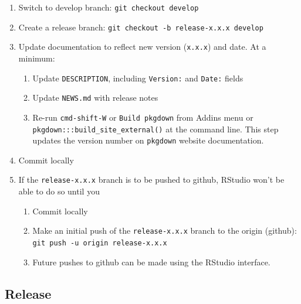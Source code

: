 \documentclass{article}
\begin{document}
\begin{enumerate}

  \item Switch to develop branch: \texttt{git checkout develop}

  \item Create a release branch: \texttt{git checkout -b release-x.x.x develop} 

  \item Update documentation to reflect new version (\texttt{x.x.x}) and date.
        At a minimum:
  \begin{enumerate}

    \item Update \texttt{DESCRIPTION}, including \texttt{Version:} and \texttt{Date:} fields 

    \item Update \texttt{NEWS.md} with release notes
	
	\item Re-run \texttt{cmd-shift-W} or \texttt{Build pkgdown} from Addins menu or \\
		  \verb#pkgdown:::build_site_external()# at the command line.
		  This step updates the version number on \texttt{pkgdown} website documentation. 

  \end{enumerate}
  \item Commit locally
  
  \item If the \texttt{release-x.x.x} branch is to be pushed to github, RStudio won't be able to do so until you
  \begin{enumerate}

    \item Commit locally

    \item Make an initial push of the \texttt{release-x.x.x} branch
	      to the origin (github): 
		  \texttt{git push -u origin release-x.x.x} 
	
	\item Future pushes to github can be made using the RStudio interface.

  \end{enumerate}

\end{enumerate}


\subsection{Release} 
\label{sec:release}
\end{document}
